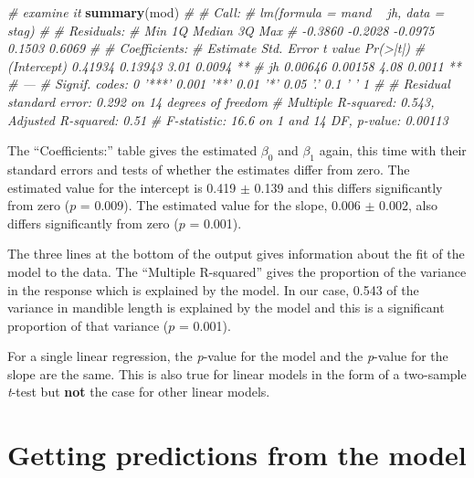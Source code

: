 \documentclass[
]{book}
\newenvironment{Shaded}{\begin{snugshade}}{\end{snugshade}}
\newcommand{\CommentTok}[1]{\textcolor[rgb]{0.56,0.35,0.01}{\textit{#1}}}
\newcommand{\KeywordTok}[1]{\textcolor[rgb]{0.13,0.29,0.53}{\textbf{#1}}}
\newcommand{\NormalTok}[1]{#1}
\begin{document}
\begin{Shaded}
\begin{Highlighting}[]
\CommentTok{# examine it}
\KeywordTok{summary}\NormalTok{(mod)}
\CommentTok{# }
\CommentTok{# Call:}
\CommentTok{# lm(formula = mand ~ jh, data = stag)}
\CommentTok{# }
\CommentTok{# Residuals:}
\CommentTok{#     Min      1Q  Median      3Q     Max }
\CommentTok{# -0.3860 -0.2028 -0.0975  0.1503  0.6069 }
\CommentTok{# }
\CommentTok{# Coefficients:}
\CommentTok{#             Estimate Std. Error t value Pr(>|t|)   }
\CommentTok{# (Intercept)  0.41934    0.13943    3.01   0.0094 **}
\CommentTok{# jh           0.00646    0.00158    4.08   0.0011 **}
\CommentTok{# ---}
\CommentTok{# Signif. codes:  0 '***' 0.001 '**' 0.01 '*' 0.05 '.' 0.1 ' ' 1}
\CommentTok{# }
\CommentTok{# Residual standard error: 0.292 on 14 degrees of freedom}
\CommentTok{# Multiple R-squared:  0.543,   Adjusted R-squared:  0.51 }
\CommentTok{# F-statistic: 16.6 on 1 and 14 DF,  p-value: 0.00113}
\end{Highlighting}
\end{Shaded}

The ``Coefficients:'' table gives the estimated \(\beta_{0}\) and \(\beta_{1}\) again, this time with their standard errors and tests of whether the estimates differ from zero. The estimated value for the intercept is 0.419 \(\pm\) 0.139 and this differs significantly from zero (\(p\) = 0.009). The estimated value for the slope, 0.006 \(\pm\) 0.002, also differs significantly from zero (\(p\) = 0.001).

The three lines at the bottom of the output gives information about the fit of the model to the data. The ``Multiple R-squared'' gives the proportion of the variance in the response which is explained by the model. In our case, 0.543 of the variance in mandible length is explained by the model and this is a significant proportion of that variance (\(p\) = 0.001).

For a single linear regression, the \emph{p}-value for the model and the \emph{p}-value for the slope are the same. This is also true for linear models in the form of a two-sample \emph{t}-test but \textbf{not} the case for other linear models.

\hypertarget{getting-predictions-from-the-model}{%
\section{Getting predictions from the model}\label{getting-predictions-from-the-model}}
\end{document}
